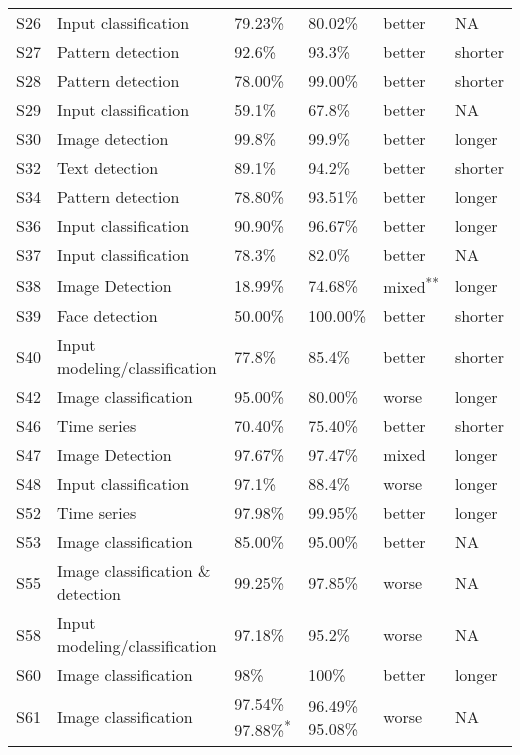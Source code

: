 \documentclass{article}
\begin{document}
\begin{table*}[!htbp]
\begin{tabularx}{\textwidth}{p{.2cm} p{5.1cm}  p{4cm} p{4cm} p{1.5cm} p{1cm} }
S26 	&	 Input classification 			&	 79.23\% 	&	 80.02\% 	&	 better 	&	 NA 	\\
S27 	&	 Pattern detection 			&	 92.6\% 	&	 93.3\% 	&	 better 	&	 shorter 	\\
S28 	&	 Pattern detection 			&	 78.00\% 	&	 99.00\% 	&	 better 	&	 shorter 	\\
S29 	&	 Input classification 			&	 59.1\% 	&	 67.8\% 	&	 better 	&	 NA 	\\
S30 	&	 Image detection 			&	 99.8\% 	&	 99.9\% 	&	 better 	&	 longer  	\\
S32 	&	 Text detection 			&	 89.1\% 	&	 94.2\% 	&	 better 	&	 shorter 	\\
S34 	&	 Pattern detection 			&	 78.80\% 	&	 93.51\% 	&	 better 	&	 longer  	\\
S36 	&	 Input classification 			&	 90.90\% 	&	 96.67\% 	&	 better 	&	 longer 	\\
S37 	&	 Input classification 			&	 78.3\% 	&	 82.0\% 	&	 better 	&	 NA 	\\
S38 	&	 Image Detection 			&	 18.99\% 	&	 74.68\% 	&	 mixed\textsuperscript{**} 	&	 longer 	\\
S39 	&	 Face detection 			&	 50.00\% 	&	 100.00\% 	&	 better 	&	 shorter 	\\
S40 	&	 Input modeling/classification 			&	 77.8\% 	&	 85.4\% 	&	 better 	&	 shorter 	\\
S42 	&	 Image classification 			&	 95.00\% 	&	 80.00\% 	&	 worse 	&	 longer  	\\
S46 	&	 Time series 			&	 70.40\% 	&	 75.40\% 	&	 better 	&	 shorter 	\\
S47 	&	 Image Detection 			&	 97.67\% 	&	 97.47\% 	&	 mixed 	&	 longer  	\\
S48 	&	 Input classification 			&	 97.1\% 	&	 88.4\% 	&	 worse 	&	 longer  	\\
S52 	&	 Time series 			&	 97.98\% 	&	 99.95\% 	&	 better 	&	 longer  	\\
S53 	&	 Image classification 			&	 85.00\% 	&	 95.00\% 	&	 better 	&	 NA 	\\
S55 	&	 Image classification \& detection 			&	 99.25\% 	&	 97.85\% 	&	 worse 	&	 NA 	\\
S58 	&	 Input modeling/classification 			&	 97.18\% 	&	 95.2\% 	&	 worse 	&	 NA 	\\
S60 	&	 Image classification 			&	 98\% 	&	 100\% 	&	 better 	&	 longer  	\\
S61 	&	 Image classification 			&	 97.54\% 97.88\%\textsuperscript{*} 	&	 96.49\% 95.08\% 	&	 worse 	&	 NA 	\\

\end{tabularx}
\end{table*}
\end{document}
